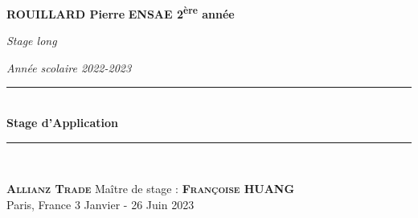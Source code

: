 \newcommand{\HRule}{\rule{\linewidth}{0.5mm}}

\begin{titlepage}
\begin{center}

\begin{minipage}{1\textwidth}
\Large{\textbf{ROUILLARD Pierre}} 
\hfill
\large{\textbf{ENSAE 2\textsuperscript{ère} année}}\par
\vspace{0cm}
\hfill \normalsize{\textit{Stage long}}\par
\hfill \normalsize{\textit{Année scolaire 2022-2023}}  
\end{minipage}

\vspace{8cm}



\begin{center}
\HRule \\[.5cm]
{\huge \bfseries{Stage d'Application}}\\[0.5cm]
\HRule \\[2.5cm]
\end{center}

\vfill

\begin{minipage}{1\textwidth}
\begin{flushleft}
\large{\textbf{\textsc{Allianz Trade}}} \hfill \small{Maître de stage :} \large{\textbf{\textsc{Françoise HUANG}}} \\ 
\small{Paris, France} \hfill \small{3 Janvier - 26 Juin 2023}
\end{flushleft}
\end{minipage}

\end{center}
\end{titlepage}